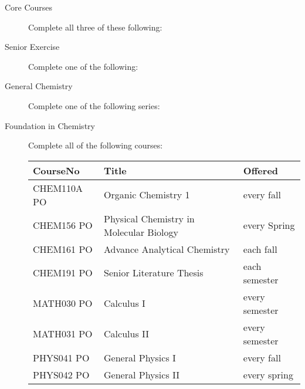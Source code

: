 \documentclass{article}\usepackage[]{graphicx}\usepackage[]{xcolor}
\newenvironment{itemize*}%
  {\begin{itemize}%
    \setlength{\itemsep}{0pt}%
    \setlength{\parskip}{0pt}}%
  {\end{itemize}}
\begin{document}
\begin{description}

 \item[Core Courses] Complete all three of these following:
  

  \item[Senior Exercise] Complete one of the following:
  

\item[General Chemistry] Complete one of the following series:


\item[Foundation in Chemistry] Complete all of the following courses:

\begin{table}[ht]
\centering
\begin{tabular}{lll}
  \hline
CourseNo & Title & Offered \\ 
  \hline
CHEM110A PO & Organic Chemistry 1 & every fall \\ 
  CHEM156 PO & Physical Chemistry in Molecular Biology & every Spring \\ 
  CHEM161 PO & Advance Analytical Chemistry & each fall \\ 
  CHEM191 PO & Senior Literature Thesis & each semester \\ 
  MATH030 PO & Calculus I & every semester \\ 
  MATH031 PO & Calculus II & every semester \\ 
  PHYS041 PO & General Physics I & every fall \\ 
  PHYS042 PO & General Physics II & every spring \\ 
   \hline
\end{tabular}
\end{table}



\end{description}
\end{document}
